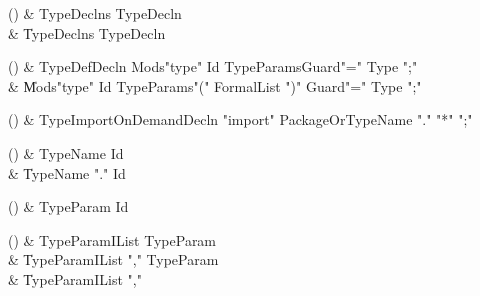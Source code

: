 \begin{bbgrammarappendix}{4.0in}

() & TypeDeclns \label{prod:TypeDeclns}  \: TypeDecln  \\

 &    \| TypeDeclns TypeDecln \\

\end{bbgrammarappendix}

\begin{bbgrammarappendix}{3.8in}

() & TypeDefDecln \label{prod:TypeDefDecln}  \: Mods\opt \xcd"type" Id TypeParams\opt Guard\opt \xcd"=" Type \xcd";"  \\

 &    \| Mods\opt \xcd"type" Id TypeParams\opt \xcd"(" FormalList \xcd")" Guard\opt \xcd"=" Type \xcd";" \\

\end{bbgrammarappendix}

\begin{bbgrammarappendix}{2.7in}

() & TypeImportOnDemandDecln \label{prod:TypeImportOnDemandDecln}  \: \xcd"import" PackageOrTypeName \xcd"." \xcd"*" \xcd";"  \\


\end{bbgrammarappendix}

\begin{bbgrammarappendix}{4.2in}

() & TypeName \label{prod:TypeName}  \: Id  \\

 &    \| TypeName \xcd"." Id \\

\end{bbgrammarappendix}

\begin{bbgrammarappendix}{4.1in}

() & TypeParam \label{prod:TypeParam}  \: Id  \\


\end{bbgrammarappendix}

\begin{bbgrammarappendix}{3.6in}

() & TypeParamIList \label{prod:TypeParamIList}  \: TypeParam  \\

 &    \| TypeParamIList \xcd"," TypeParam \\
 &    \| TypeParamIList \xcd"," \\

\end{bbgrammarappendix}

